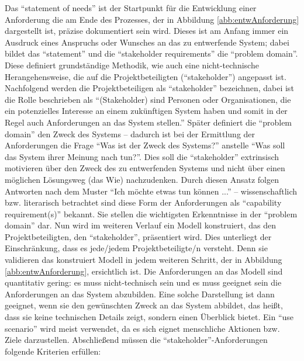 Das \enquote{statement of needs} ist der Startpunkt für die Entwicklung einer Anforderung die am Ende des Prozesses, der in Abbildung \vref{abb:entwAnforderung} dargestellt ist, präzise dokumentiert sein wird. Dieses ist am Anfang immer ein Ausdruck eines Anspruchs oder Wunsches an das zu entwerfende System; dabei bildet das \enquote{statement} und die \enquote{stakeholder requirements} die \enquote{problem domain}. Diese definiert grundständige Methodik, wie auch eine nicht-technische Herangehensweise, die auf die Projektbeteiligten (\enquote{stakeholder}) angepasst ist. Nachfolgend werden die Projektbeteiligen als \enquote{stakeholder} bezeichnen, dabei ist die Rolle beschrieben als \enquote{(Stakeholder) sind Personen oder Organisationen, die ein potenzielles Interesse an einem zukünftigen System haben und somit in der Regel auch Anforderungen an das System stellen.}\autocite[][S.8]{partsch_requirements-engineering_2010} Später definiert die \enquote{problem domain} den Zweck des Systems -- dadurch ist bei der Ermittlung der Anforderungen die Frage \enquote{Was ist der Zweck des Systems?} anstelle \enquote{Was soll das System ihrer Meinung nach tun?}. Dies soll die \enquote{stakeholder} extrinsisch motivieren über den Zweck des zu entwerfenden Systems und nicht über einen möglichen Lösungsweg (das Wie) nachzudenken. Durch diesen Ansatz folgen Antworten nach dem Muster \enquote{Ich möchte etwas tun können ...} -- wissenschaftlich bzw. literarisch betrachtet sind diese Form der Anforderungen als \enquote{capability requirement(s)}\autocite[vgl.][S.94]{hull_requirements_2011} bekannt. Sie stellen die wichtigsten Erkenntnisse in der \enquote{problem domain} dar. Nun wird im weiteren Verlauf ein Modell konstruiert, das den Projektbeteiligten, den \enquote{stakeholder}, präsentiert wird. Dies unterliegt der Einschränkung, dass es jede/jedem Projektbeteiligte/n versteht. Denn sie validieren das konstruiert Modell in jedem weiteren Schritt, der in Abbildung \vref{abb:entwAnforderung}, ersichtlich ist. Die Anforderungen an das Modell sind quantitativ gering: es muss nicht-technisch sein und es muss geeignet sein die Anforderungen an das System abzubilden. Eine solche Darstellung ist dann geeignet, wenn sie den gewünschten Zweck an das System abbildet, das heißt, dass sie keine technischen Details zeigt, sondern einen Überblick bietet. Ein \enquote{use scenario}\autocite[vgl.][S.94]{hull_requirements_2011} wird meist verwendet, da es sich eignet menschliche Aktionen bzw. Ziele darzustellen. Abschließend müssen die \enquote{stakeholder}-Anforderungen folgende Kriterien erfüllen: 

